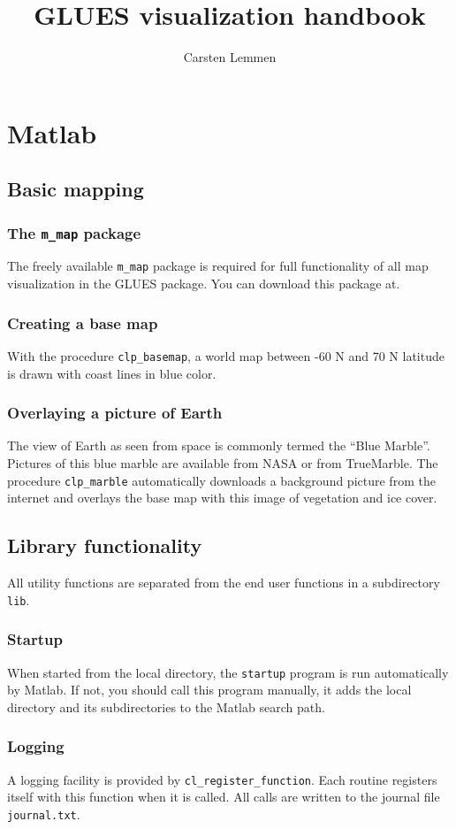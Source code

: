\documentclass{report}
\author{Carsten Lemmen}
\title{GLUES visualization handbook}
\newcommand{\code}[1]{\verb|#1|}
\begin{document}
\maketitle

\chapter{Matlab}


\section{Basic mapping}

\subsection{The \code{m_map} package}

The freely available \code{m_map} package is required for full functionality of all map visualization in the GLUES package.  You can download this package 
at.  

\subsection{Creating a base map}
With the procedure \code{clp_basemap}, a world map between -60 N and 70 N latitude is drawn with coast lines in blue color.

\subsection{Overlaying a picture of Earth}
The view of Earth as seen from space is commonly termed the ``Blue Marble''.  Pictures of this blue marble are available from NASA or from TrueMarble.
The procedure \code{clp_marble} automatically downloads a background picture from the internet and overlays the base map with this image of vegetation and ice cover.

\section{Library functionality}
All utility functions are separated from the end user functions in a subdirectory \code{lib}.  

\subsection{Startup}
When started from the local directory, the \code{startup} program is run automatically by Matlab.  If not, you should call this program manually, it adds the local directory and its subdirectories to the Matlab search path.

\subsection{Logging}
A logging facility is provided by \code{cl_register_function}.  Each routine registers itself with this function when it is called.  All calls are written to the journal
file \code{journal.txt}.
\end{document}

